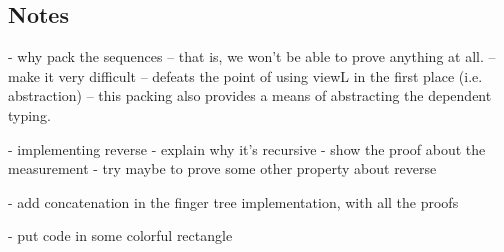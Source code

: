 \documentclass[12pt,twoside,notitlepage]{report}
\begin{document}
\subsection{Notes}

- why pack the sequences
 -- that is, we won't be able to prove anything at all.
 -- make it very difficult
 -- defeats the point of using viewL in the first place (i.e. abstraction)
 -- this packing also provides a means of abstracting the dependent typing.
 
- implementing reverse - explain why it's recursive
- show the proof about the measurement
- try maybe to prove some other property about reverse

- add concatenation in the finger tree implementation, with all the proofs

- put code in some colorful rectangle


























 
\end{document}
